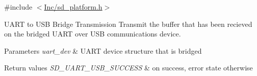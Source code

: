 {\ttfamily \#include $<$\mbox{\hyperlink{sd__platform_8h}{Inc/sd\+\_\+platform.\+h}}$>$}



U\+A\+RT to U\+SB Bridge Transmission Transmit the buffer that has been recieved on the bridged U\+A\+RT over U\+SB communications device. 


\begin{DoxyParams}{Parameters}
{\em uart\+\_\+dev} & U\+A\+RT device structure that is bridged \\
\hline
\end{DoxyParams}

\begin{DoxyRetVals}{Return values}
{\em S\+D\+\_\+\+U\+A\+R\+T\+\_\+\+U\+S\+B\+\_\+\+S\+U\+C\+C\+E\+SS} & on success, error state otherwise \\
\hline
\end{DoxyRetVals}

